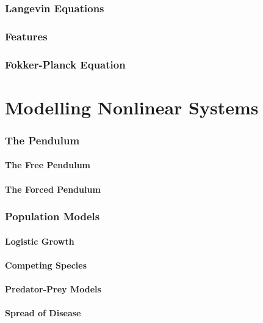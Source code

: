 \documentclass[a4paper]{article}
\numberwithin{equation}{section}
\numberwithin{figure}{section}
\numberwithin{table}{section}
\theoremstyle{remark}
\begin{document}
\section{Langevin Equations}


\section{Features}


\section{Fokker-Planck Equation}


\newpage
\part{Modelling Nonlinear Systems}

\section{The Pendulum}
\subsection{The Free Pendulum}


\subsection{The Forced Pendulum}


\section{Population Models}


\subsection{Logistic Growth}


\subsection{Competing Species}


\subsection{Predator-Prey Models}


\subsection{Spread of Disease}


\begin{appendix}
	\nocite{*}
	\begin{comment}
	\newpage
	\listoffigures
	\listoftables
	\end{comment}
	\printbibliography[
	heading=bibintoc,
	title={References}
	]
\end{appendix}
\end{document}
